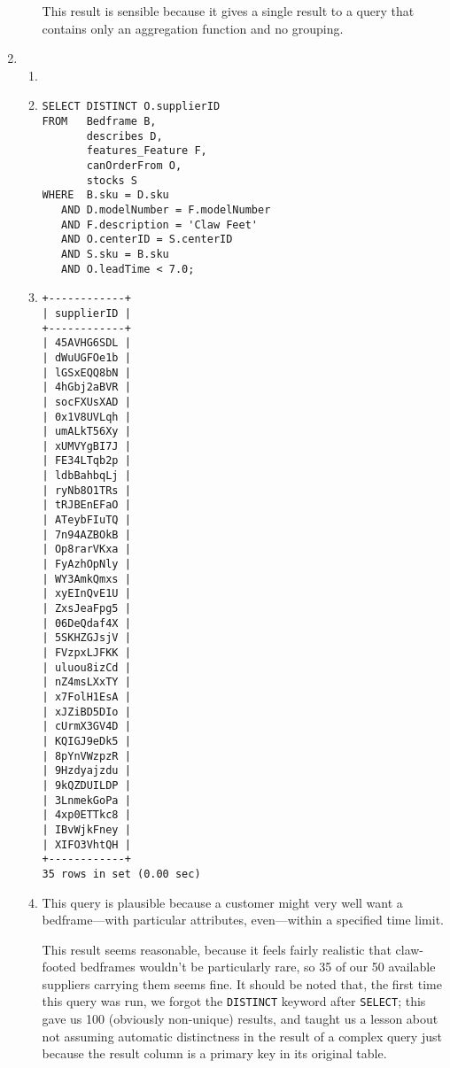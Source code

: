 \documentclass[american,extrafontsizes,12pt,portrait,letterpaper,oneside,onecolumn,article,final]{memoir}
\newcommand*{\mysqli}[1]{\texttt{#1}}
\begin{document}
\begin{enumerate}[leftmargin=*,label={\strong{\uline{(\emph{\Alph*})}}}]
\begin{enumerate}[leftmargin=*,widest={\strong{Explanation:}}]
This result is sensible because it gives a single result to a query that contains only an aggregation function and no grouping.
\end{enumerate}

\item
\begin{enumerate}[leftmargin=*,widest={\strong{Explanation:}}]
\item[\strong{Intent:}] 
\item[\strong{Query:}]
\begin{verbatim}
SELECT DISTINCT O.supplierID
FROM   Bedframe B,
       describes D,
       features_Feature F,
       canOrderFrom O,
       stocks S
WHERE  B.sku = D.sku
   AND D.modelNumber = F.modelNumber
   AND F.description = 'Claw Feet'
   AND O.centerID = S.centerID
   AND S.sku = B.sku
   AND O.leadTime < 7.0;
\end{verbatim}
\item[\strong{Result:}]
\begin{verbatim}
+------------+
| supplierID |
+------------+
| 45AVHG6SDL |
| dWuUGFOe1b |
| lGSxEQQ8bN |
| 4hGbj2aBVR |
| socFXUsXAD |
| 0x1V8UVLqh |
| umALkT56Xy |
| xUMVYgBI7J |
| FE34LTqb2p |
| ldbBahbqLj |
| ryNb8O1TRs |
| tRJBEnEFaO |
| ATeybFIuTQ |
| 7n94AZBOkB |
| Op8rarVKxa |
| FyAzhOpNly |
| WY3AmkQmxs |
| xyEInQvE1U |
| ZxsJeaFpg5 |
| 06DeQdaf4X |
| 5SKHZGJsjV |
| FVzpxLJFKK |
| uluou8izCd |
| nZ4msLXxTY |
| x7FolH1EsA |
| xJZiBD5DIo |
| cUrmX3GV4D |
| KQIGJ9eDk5 |
| 8pYnVWzpzR |
| 9Hzdyajzdu |
| 9kQZDUILDP |
| 3LnmekGoPa |
| 4xp0ETTkc8 |
| IBvWjkFney |
| XIFO3VhtQH |
+------------+
35 rows in set (0.00 sec)
\end{verbatim}
\item[\strong{Explanation:}] This query is plausible because a customer might very well want a bedframe---with particular attributes, even---within a specified time limit.

This result seems reasonable, because it feels fairly realistic that claw\hyp footed bedframes wouldn't be particularly rare, so 35 of our 50 available suppliers carrying them seems fine.
It should be noted that, the first time this query was run, we forgot the \mysqli{DISTINCT} keyword after \mysqli{SELECT}; this gave us 100 (obviously non\hyp unique) results, and taught us a lesson about not assuming automatic distinctness in the result of a complex query just because the result column is a primary key in its original table.
\end{enumerate}


\end{enumerate}
\end{document}

